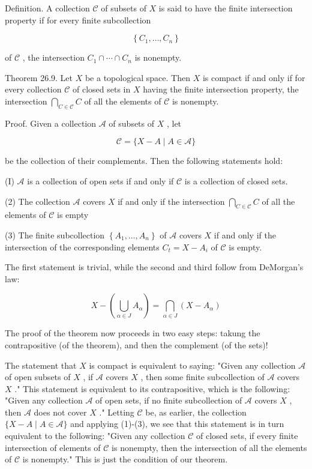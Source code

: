 \documentclass[10pt]{article}
\begin{document}
Definition. A collection \(\mathcal{C}\) of subsets of \(X\) is said to have the finite intersection property if for every finite subcollection

\[
\left\{  {{C}_{1},\ldots ,{C}_{n}}\right\}
\]

of \(\mathcal{C}\) , the intersection \({C}_{1} \cap  \cdots  \cap  {C}_{n}\) is nonempty.

Theorem 26.9. Let \(X\) be a topological space. Then \(X\) is compact if and only if for every collection \(\mathcal{C}\) of closed sets in \(X\) having the finite intersection property, the intersection \(\mathop{\bigcap }\limits_{{C \in  \mathcal{C}}}C\) of all the elements of \(\mathcal{C}\) is nonempty.

Proof. Given a collection \(\mathcal{A}\) of subsets of \(X\) , let

\[
\mathcal{C} = \{ X - A \mid  A \in  \mathcal{A}\}
\]

be the collection of their complements. Then the following statements hold:

(I) \(\mathcal{A}\) is a collection of open sets if and only if \(\mathcal{C}\) is a collection of closed sets.

(2) The collection \(\mathcal{A}\) covers \(X\) if and only if the intersection \(\mathop{\bigcap }\limits_{{C \in  \mathcal{C}}}C\) of all the elements of \(\mathcal{C}\) is empty

(3) The finite subcollection \(\left\{  {{A}_{1},\ldots ,{A}_{n}}\right\}\) of \(\mathcal{A}\) covers \(X\) if and only if the intersection of the corresponding elements \({C}_{t} = X - {A}_{i}\) of \(\mathcal{C}\) is empty.

The first statement is trivial, while the second and third follow from DeMorgan's law:

\[
X - \left( {\mathop{\bigcup }\limits_{{\alpha  \in  J}}{A}_{\alpha }}\right)  = \mathop{\bigcap }\limits_{{\alpha  \in  J}}\left( {X - {A}_{\alpha }}\right)
\]

The proof of the theorem now proceeds in two easy steps: takung the contrapositive (of the theorem), and then the complement (of the sets)!

The statement that \(X\) is compact is equivalent to saying: "Given any collection \(\mathcal{A}\) of open subsets of \(X\) , if \(\mathcal{A}\) covers \(X\) , then some finite subcollection of \(\mathcal{A}\) covers \(X\) ." This statement is equivalent to its contrapositive, which is the following: "Given any collection \(\mathcal{A}\) of open sets, if no finite subcollection of \(\mathcal{A}\) covers \(X\) , then \(\mathcal{A}\) does not cover \(X\) ." Letting \(\mathcal{C}\) be, as earlier, the collection \(\{ X - A \mid  A \in  \mathcal{A}\}\) and applying (1)-(3), we see that this statement is in turn equivalent to the following: "Given any collection \(\mathcal{C}\) of closed sets, if every finite intersection of elements of \(\mathcal{C}\) is nonempty, then the intersection of all the elements of \(\mathcal{C}\) is nonempty." This is just the condition of our theorem.
\end{document}
